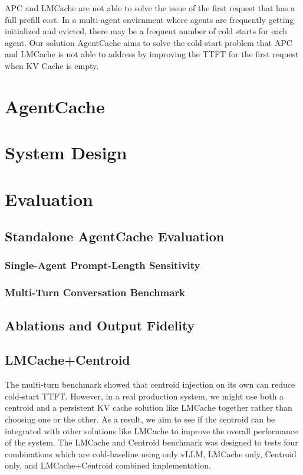 \documentclass[letterpaper,twocolumn,10pt]{article}
\begin{document}
APC and LMCache are not able to solve the issue of the first request that has a full prefill cost. In a multi-agent envirnment where agents are frequently getting initialized and evicted, there may be a frequent number of cold starts for each agent. Our solution AgentCache aims to solve the cold-start problem that APC and LMCache is not able to address by improving the TTFT for the first request when KV Cache is empty.

\section{AgentCache}

\section{System Design}

\section{Evaluation}
\subsection{Standalone AgentCache Evaluation}

\subsubsection{Single-Agent Prompt-Length Sensitivity}
\subsubsection{Multi-Turn Conversation Benchmark}

\subsection{Ablations and Output Fidelity}


\subsection{LMCache+Centroid}
The multi-turn benchmark showed that centroid injection on its own can reduce cold-start TTFT. However, in a real production system, we might use both a centroid and a persistent KV cache solution like LMCache together rather than choosing one or the other. As a result, we aim to see if the centroid can be integrated with other solutions like LMCache to improve the overall performance of the system. The LMCache and Centroid benchmark was designed to tests four combinations which are cold-baseline using only vLLM, LMCache only, Centroid only, and LMCache+Centroid combined implementation.
\end{document}
